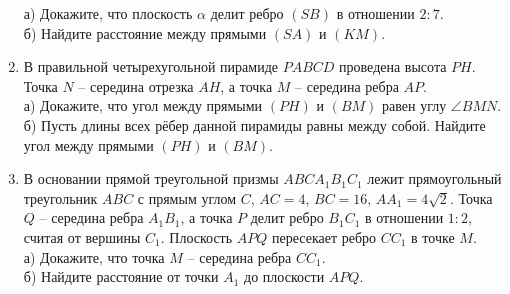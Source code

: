\documentclass[12pt]{article}
\begin{document}
\begin{enumerate}[start=1,label={\itshape\bfseries \arabic*.}]
        а) Докажите, что плоскость $\alpha$ делит ребро $(SB)$ в отношении $2 : 7$.\\
        б) Найдите расстояние между прямыми $(SA)$ и $(KM)$.
        \item В правильной четырехугольной пирамиде $PABCD$ проведена высота $PH$. Точка $N$ -- середина отрезка $AH$, а точка $M$ -- середина ребра $AP$.\\
        а) Докажите, что угол между прямыми $(PH)$ и $(BM)$ равен углу $\angle BMN$.\\
        б) Пусть длины всех рёбер данной пирамиды равны между собой. Найдите угол между прямыми $(PH)$ и $(BM)$.
        \item В основании прямой треугольной призмы $ABC A_1 B_1 C_1$ лежит прямоугольный треугольник $ABC$ с прямым углом $C$, $AC = 4$, $BC = 16$, $AA_1 = 4\sqrt{2}$. Точка $Q$ -- середина ребра $A_1 B_1$, а точка $P$ делит ребро $B_1 C_1$ в отношении $1 : 2$, считая от вершины $C_1$. Плоскость $APQ$ пересекает ребро $C C_1$ в точке $M$.\\
        а) Докажите, что точка $M$ -- середина ребра $C C_1$.\\
        б) Найдите расстояние от точки $A_1$ до плоскости $APQ$.
    \end{enumerate}
\end{document}
